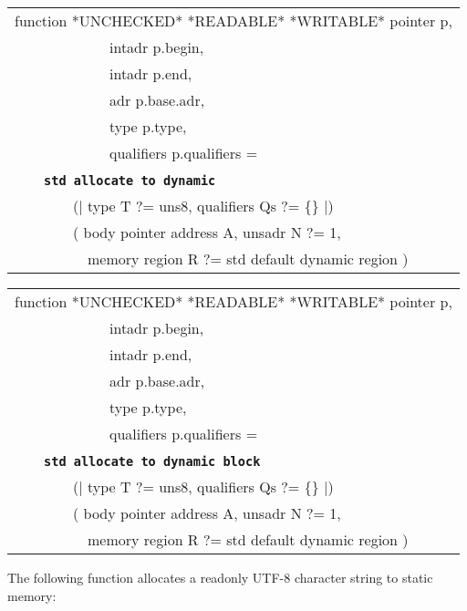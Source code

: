 \documentclass[12pt]{article}
\makeatletter
\newcommand{\TT}[1]{{\tt \bfseries #1}}
\newcommand{\ttstdkey}[1]{\TT{std #1}\index{#1@{\tt std #1}}}
\newcommand{\ttstdlkey}[2]{\TT{std #1 #2}\index{#1@{\tt std #1}!#2@{\tt #2}}}
\newenvironment{indpar}[1][0.3in]%
	{\begin{list}{}%
		     {\setlength{\itemsep}{0in}%
		      \setlength{\topsep}{0in}%
		      \setlength{\parsep}{1ex}%
		      \setlength{\labelwidth}{#1}%
		      \setlength{\leftmargin}{#1}%
		      \addtolength{\leftmargin}{\labelsep}}%
	 \item}%
	{\end{list}}
\makeatother
\begin{document}
\begin{indpar}
{\tt\begin{tabular}{@{}l}
function *UNCHECKED* *READABLE* *WRITABLE* pointer p, \\
~~~~~~~~~~~~~intadr p.begin, \\
~~~~~~~~~~~~~intadr p.end, \\
~~~~~~~~~~~~~adr p.base.adr, \\
~~~~~~~~~~~~~type p.type, \\
~~~~~~~~~~~~~qualifiers p.qualifiers = \\
~~~~\ttstdkey{allocate to dynamic} \\
~~~~~~~~(| type T ?= uns8, qualifiers Qs ?= \{\} |) \\
~~~~~~~~( body pointer address A, unsadr N ?= 1, \\
~~~~~~~~~~memory region R ?= std default dynamic region ) \\
\end{tabular}}

{\tt\begin{tabular}{@{}l}
function *UNCHECKED* *READABLE* *WRITABLE* pointer p, \\
~~~~~~~~~~~~~intadr p.begin, \\
~~~~~~~~~~~~~intadr p.end, \\
~~~~~~~~~~~~~adr p.base.adr, \\
~~~~~~~~~~~~~type p.type, \\
~~~~~~~~~~~~~qualifiers p.qualifiers = \\
~~~~\ttstdlkey{allocate}{to dynamic block} \\
~~~~~~~~(| type T ?= uns8, qualifiers Qs ?= \{\} |) \\
~~~~~~~~( body pointer address A, unsadr N ?= 1, \\
~~~~~~~~~~memory region R ?= std default dynamic region ) \\
\end{tabular}}

\end{indpar}

The following function allocates a readonly UTF-8 character
string to static memory:
\end{document}
